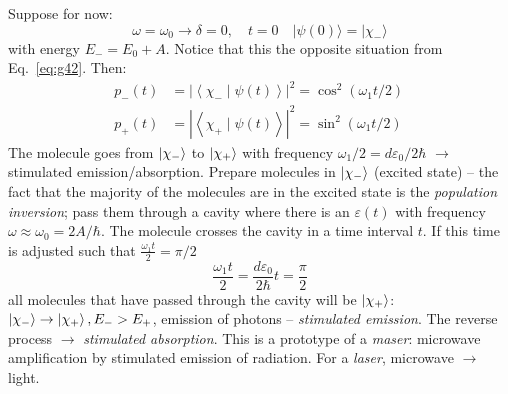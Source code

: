\documentclass[12pt]{article}
\newcommand{\be}{\begin{equation}}
\newcommand{\ee}{\end{equation}}
\begin{document}
Suppose for now:
\[
\omega=\omega_{0} \rightarrow \delta=0, \quad 
t=0 \quad|\psi(0)\rangle=|\chi_{-}\rangle
\]
with energy $E_- = E_0+A$.
Notice that this the opposite situation from Eq.~\eqref{eq:g42}. Then:
\be
\begin{aligned}
p_{-}(t)&=\left|\left\langle \chi_{-} \mid \psi(t)\right\rangle\right|^{2}=\cos ^{2}(\omega_1 t / 2) \\ 
p_{+}(t)&=\left|\left\langle \chi_{+} \mid \psi(t)\right\rangle\right|^{2}=\sin ^{2}(\omega_1 t / 2)\
\end{aligned}
\ee
The molecule goes from $\ket{\chi_-}$ to $\ket{\chi_+}$
with frequency $\omega_1/2 = d \varepsilon_{0} / 2 \hbar$ 
$\to$ stimulated emission/absorption.
Prepare molecules in $\ket{\chi_-}$ (excited state)
-- the fact that the majority of the molecules are in the excited state is the \emph{population inversion};
pass them through a cavity where there is an $\varepsilon(t)$
with frequency $\omega \approx \omega_{0}=2 A / \hbar$. The molecule
crosses the cavity in a time interval $t$.
If this time is adjusted such that $\frac{\omega_{1} t}{2}=\pi / 2$
\be
\frac{\omega_{1} t}{2}=\frac{d \varepsilon_{0}}{2 \hbar} t=\frac{\pi}{2}
\ee
all molecules that have passed through the cavity will be $\ket{\chi_+}$:
$\ket{\chi_-}\rightarrow\ket{\chi_+}, E_{-} > E_{+}$, emission of photons -- \emph{stimulated emission}.
The reverse process $\to$ \emph{stimulated absorption}.
This is a prototype of a \emph{maser}:
microwave amplification by stimulated emission of radiation.
For a \emph{laser}, microwave $\to$ light.
\end{document}
